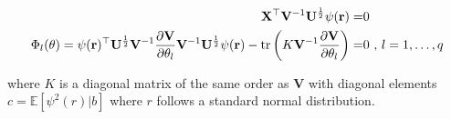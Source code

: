 \begin{align}
\label{eq:rml_beta}
\mathbf{X}^\top\mathbf{V}^{-1} \mathbf{U}^{\frac{1}{2}} \psi(\mathbf{r}) =& 0 \\
\label{eq:rml_theta}
\Phi_l(\theta) = \psi(\mathbf{r})^\top\mathbf{U}^{\frac{1}{2}}\mathbf{V}^{-1}\frac{\partial\mathbf{V}}{\partial\theta_l}\mathbf{V}^{-1}\mathbf{U}^{\frac{1}{2}} \psi(\mathbf{r}) - \operatorname{tr}\left(K\mathbf{V}^{-1}\frac{\partial\mathbf{V}}{\partial\theta_l}\right) =& 0 \text{ , } l = 1, \dots, q
\end{align}

where $K$ is a diagonal matrix of the same order as $\mathbf{V}$ with
diagonal elements $c = \mathbb{E}[\psi^2(r)|b]$ where $r$ follows a
standard normal distribution.
